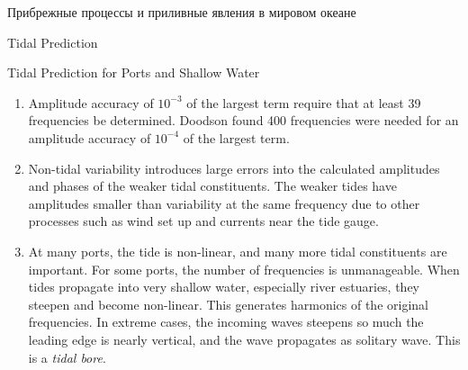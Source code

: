 \begin{chapter}{Прибрежные процессы и приливные явления в мировом океане}
\begin{section}{Tidal Prediction}
\begin{paragraph}{Tidal Prediction for Ports and Shallow Water}
\begin{enumerate}
\item 
Amplitude accuracy of $10^{-3}$ of the largest
term require that at least 39 frequencies be determined. Doodson found
400 frequencies were needed for an amplitude accuracy of $10^{-4}$ of
the largest term.
%

\item 
Non-tidal variability introduces large errors into the calculated
amplitudes and phases of the weaker tidal constituents. The weaker
tides have amplitudes smaller than variability at the same frequency
due to other processes such as wind set up and currents near the tide
gauge.
%

\item 
At many ports, the tide is non-linear, and many more tidal
constituents are important. For some ports, the number of frequencies
is unmanageable. When tides propagate into very shallow water,
especially river estuaries, they steepen and become non-linear. This
generates harmonics of the original frequencies. In extreme cases, the
incoming waves steepens so much the leading edge is nearly vertical,
and the wave propagates as solitary wave. This
is a \textit{tidal bore}.
%
\end{enumerate}


\end{paragraph}
\end{section}
\end{chapter}
